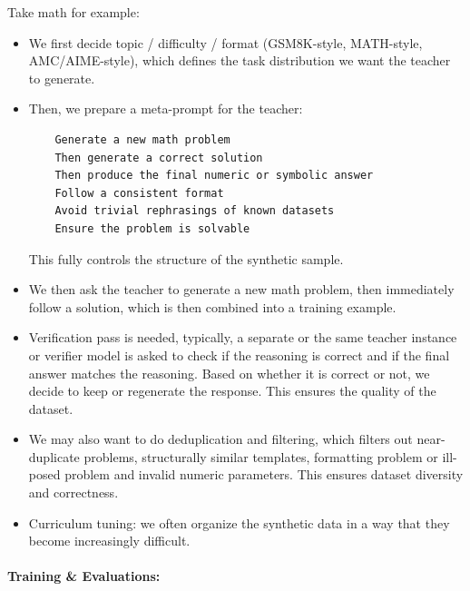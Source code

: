 \documentclass[11pt]{article}  %
\begin{document}
Take math for example:
\begin{itemize}
  \item We first decide topic / difficulty / format (GSM8K-style, MATH-style, AMC/AIME-style), which defines the task distribution we want the teacher to generate.
  
  \item Then, we prepare a meta-prompt for the teacher: 
  \begin{verbatim}
    Generate a new math problem
    Then generate a correct solution
    Then produce the final numeric or symbolic answer
    Follow a consistent format
    Avoid trivial rephrasings of known datasets
    Ensure the problem is solvable
  \end{verbatim}
  This fully controls the structure of the synthetic sample.

  \item We then ask the teacher to generate a new math problem, then immediately follow a solution, which is then combined into a training example.
  
  \item Verification pass is needed, typically, a separate or the same teacher instance or verifier model is asked to check if the reasoning is correct and if the final answer matches the reasoning. 
  Based on whether it is correct or not, we decide to keep or regenerate the response.
  This ensures the quality of the dataset.
  
  \item We may also want to do deduplication and filtering, which filters out near-duplicate problems, structurally similar templates, formatting problem or ill-posed problem and invalid numeric parameters.
  This ensures dataset diversity and correctness.

  \item Curriculum tuning: we often organize the synthetic data in a way that they become increasingly difficult.
\end{itemize}


\paragraph{Training \& Evaluations:}
\end{document}
